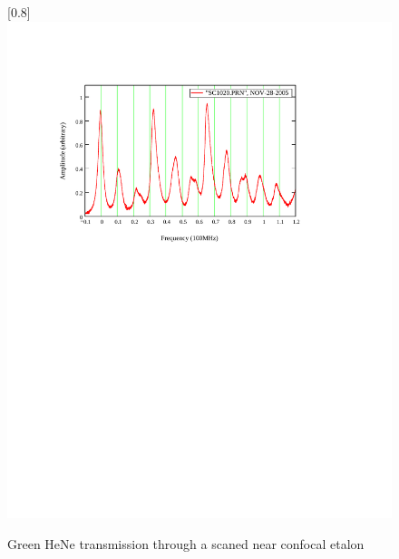 \begin{figure}
\scalebox{0.8}[0.8]{
\includegraphics[bb=15 440 489 752]
{near_confocal/near_confocal.pdf}
}
\caption[Green HeNe transmission through a scaned near confocal etalon]{Green HeNe transmission through a scaned near confocal etalon}
\label{near_confocal}
\end{figure}
